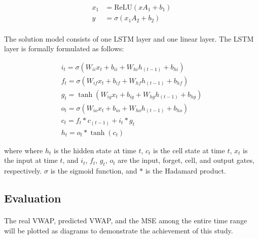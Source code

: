 \documentclass[12pt, letterpaper]{article}
\begin{document}
\begin{align*}
    x_1&=\mathrm{ReLU}(xA_1+b_1) \\
    y&=\sigma(x_1A_2+b_2)
\end{align*}


\paragraph{}
The solution model consists of one LSTM layer and one linear layer. The LSTM layer is formally formulated as follows:

\begin{equation*}
    \begin{array}{l}
        i_t = \sigma(W_{ii} x_t + b_{ii} + W_{hi} h_{(t-1)} + b_{hi}) \\
        f_t = \sigma(W_{if} x_t + b_{if} + W_{hf} h_{(t-1)} + b_{hf}) \\
        g_t = \tanh(W_{ig} x_t + b_{ig} + W_{hg} h_{(t-1)} + b_{hg}) \\
        o_t = \sigma(W_{io} x_t + b_{io} + W_{ho} h_{(t-1)} + b_{ho}) \\
        c_t = f_t * c_{(t-1)} + i_t * g_t \\
        h_t = o_t * \tanh(c_t)
    \end{array}
\end{equation*}

where where $h_t$ is the hidden state at time $t$, $c_t$ is the cell state at time $t$, $x_t$ is the input at time $t$, and $i_t$, $f_t$, $g_t$, $o_t$ are the input, forget, cell, and output gates, respectively. $\sigma$ is the sigmoid function, and $*$ is the Hadamard product.

\subsection{Evaluation}

\paragraph{}
The real VWAP, predicted VWAP, and the MSE among the entire time range will be plotted as diagrams to demonstrate the achievement of this study.
\end{document}
